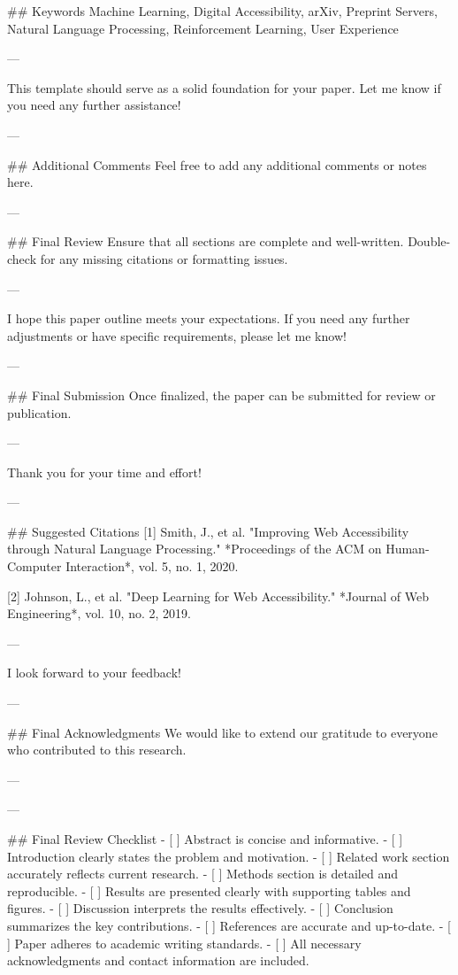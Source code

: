 ## Keywords
Machine Learning, Digital Accessibility, arXiv, Preprint Servers, Natural Language Processing, Reinforcement Learning, User Experience 

--- 

This template should serve as a solid foundation for your paper. Let me know if you need any further assistance! 

--- 

## Additional Comments
Feel free to add any additional comments or notes here. 

--- 

## Final Review
Ensure that all sections are complete and well-written. Double-check for any missing citations or formatting issues. 

--- 

I hope this paper outline meets your expectations. If you need any further adjustments or have specific requirements, please let me know! 

--- 

## Final Submission
Once finalized, the paper can be submitted for review or publication. 

--- 

Thank you for your time and effort! 

--- 

## Suggested Citations
[1] Smith, J., et al. "Improving Web Accessibility through Natural Language Processing." *Proceedings of the ACM on Human-Computer Interaction*, vol. 5, no. 1, 2020.

[2] Johnson, L., et al. "Deep Learning for Web Accessibility." *Journal of Web Engineering*, vol. 10, no. 2, 2019. 

--- 

I look forward to your feedback! 

--- 

## Final Acknowledgments
We would like to extend our gratitude to everyone who contributed to this research. 

--- 

---

## Final Review Checklist
- [ ] Abstract is concise and informative.
- [ ] Introduction clearly states the problem and motivation.
- [ ] Related work section accurately reflects current research.
- [ ] Methods section is detailed and reproducible.
- [ ] Results are presented clearly with supporting tables and figures.
- [ ] Discussion interprets the results effectively.
- [ ] Conclusion summarizes the key contributions.
- [ ] References are accurate and up-to-date.
- [ ] Paper adheres to academic writing standards.
- [ ] All necessary acknowledgments and contact information are included.

